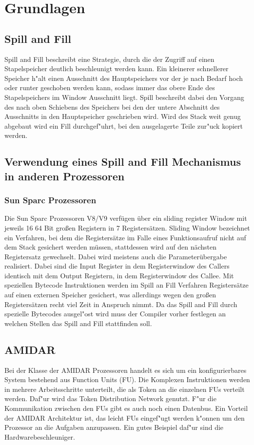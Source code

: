 \chapter{Grundlagen}
\label{cha:Grundlagen}

\section{Spill and Fill}

Spill and Fill beschreibt eine Strategie, durch die der Zugriff auf einen Stapelspeicher deutlich beschleunigt werden kann. Ein kleinerer schnellerer Speicher h"alt einen Ausschnitt des Hauptspeichers vor der je nach Bedarf hoch oder runter geschoben werden kann, sodass immer das obere Ende des Stapelspeichers im Window Ausschnitt liegt. Spill beschreibt dabei den Vorgang des nach oben Schiebens des Speichers bei den der untere Abschnitt des Ausschnitts in den Hauptspeicher geschrieben wird. Wird des Stack weit genug abgebaut wird ein Fill durchgef"uhrt, bei den ausgelagerte Teile zur"uck kopiert werden.  


\section{Verwendung eines Spill and Fill Mechanismus in anderen Prozessoren}
\subsection{Sun Sparc Prozessoren}
Die Sun Sparc Prozessoren V8/V9 verf\"ugen \"uber ein sliding register Window mit jeweils 16 64 Bit großen Registern in 7 Registers\"atzen. Sliding Window bezeichnet ein Verfahren, bei dem die Registers\"atze im Falle eines Funktionsaufruf nicht auf dem Stack gesichert werden m\"ussen, stattdessen wird auf den n\"achsten Registersatz gewechselt. Dabei wird meistens auch die Parameter\"ubergabe realisiert. Dabei sind die Input Register in dem Registerwindow des Callers identisch mit dem Output Registern, in dem Registerwindow des Callee.   
Mit speziellen Bytecode Instruktionen werden im Spill an Fill Verfahren Registers\"atze auf einen externen Speicher gesichert, was allerdings wegen den großen Registers\"atzen recht viel Zeit in Anspruch nimmt. Da das Spill and Fill durch spezielle Bytecodes ausgel"ost wird muss der Compiler vorher festlegen an welchen Stellen das Spill and Fill stattfinden soll.
\section{AMIDAR}
Bei der Klasse der AMIDAR Prozessoren handelt es sich um ein konfigurierbares System bestehend aus Function Units (FU). Die Komplexen Instruktionen werden in mehrere Arbeitsschritte unterteilt, die als Token an die einzelnen FUs verteilt werden. Daf"ur wird das Token Distribution Network genutzt. F"ur die Kommunikation zwischen den FUs gibt es auch noch einen Datenbus. Ein Vorteil der AMIDAR Architektur ist, das leicht FUs eingef"ugt werden k"onnen um den Prozessor an die Aufgaben anzupassen. Ein gutes Beispiel daf"ur sind die Hardwarebeschleuniger. 

